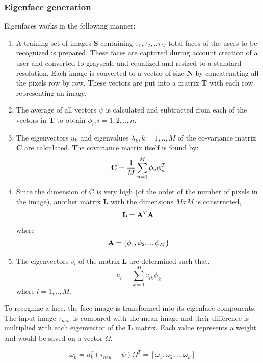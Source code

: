 \documentclass[%
        final,
        notitlepage,
        narroweqnarray,
        inline,
        ]{ieee}
\begin{document}
\subsubsection{ Eigenface generation }
Eigenfaces works in the following manner:
\begin{enumerate}
	\item A training set of images {\bf S} containing $\tau_{1},\tau_{2},..\tau_{M}$ total faces of the users to be recognized is prepared. These faces are captured during account creation of a user and converted to grayscale and equalized and resized to a standard resolution. Each image is converted to a vector of size {\bf N} by concatenating all the pixels row by row. These vectors are put into a matrix {\bf T} with each row representing an image.
	\item The average of all vectors $\psi$ is calculated and subtracted from each of the vectors in {\bf T} to obtain $\phi_{i}, i = 1,2,..,n$.
	\item The eigenvectors $u_{k}$ and eigenvalues $\lambda_{k}, k = 1,..,M$ of the co-variance matrix {\bf C} are calculated. The covariance matrix itself is found by: 
\begin{equation}
{\bf C} = \frac{1}{M}\sum_{n=1}^{M}\phi_{n}\phi_{n}^{T}
\end{equation}
	\item Since the dimension of C is very high (of the order of the number of pixels in the image), another matrix {\bf L} with the dimensions $MxM$ is constructed, 
	\begin{equation}
	{\bf L} = {\bf A}^{T}{\bf A}
	\end{equation}
	where 
	\begin{equation}
	{\bf A} = \{\phi_{1},\phi_{2},..,\phi_{M}\}
	\end{equation}
	\item The eigenvectors $v_{l}$ of the matrix {\bf L} are determined such that,
	\begin{equation}
	u_{l} = \sum_{k=1}^{M}v_{lk}\phi_{k} 
	\end{equation}
where $l = 1,..,M$.
\end{enumerate}

To recognize a face, the face image is transformed into its eigenface components. The input image $\tau_{new}$ is compared with the mean image and their difference is multiplied with each eigenvector of the {\bf L} matrix. Each value represents a weight and would be saved on a vector $\Omega$.

\begin{equation}
\omega_{k} = u_{k}^{T}(\tau_{new} - \psi)	\Omega^{T} = [\omega_{1},\omega_{2},..,\omega_{k}] 
\end{equation}
\end{document}
